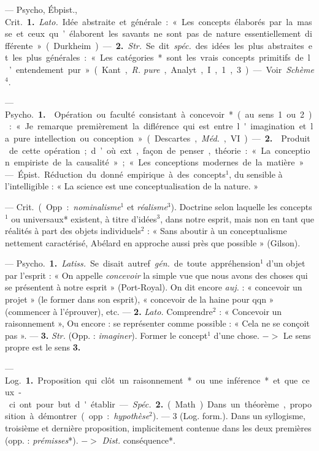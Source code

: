 \begin{itemize}[leftmargin=1cm, label=, itemsep=11pt]
 — \si{Psycho, Ébpist., Crit.} {\bf 1.}
 {\it Lato.} Idée abstraite et générale :
« Les concepts élaborés par la masse
et ceux qu’élaborent les savants ne
sont pas de nature essentiellement
différente » (Durkheim). — {\bf 2.}  {\it Str.}
Se dit  {\it spéc.} des idées les plus
abstraites et les plus générales :
« Les catégories* sont les vrais
concepts primitifs de l’entendement
pur» (Kant, {\it R. pure}, Analyt., I, 1, 3).
— Voir {\it Schème}$^4$.

 — \si{Psycho.} {\bf 1.}  Opération ou faculté consistant à concevoir* (au sens 1 ou 2) : « Je remarque
premièrement la diflérence qui est
entre l'imagination et la pure intellection ou conception » (Descartes,
{\it Méd.}, VI). — {\bf 2.}  Produit de cette
opération; d’où ext., façon de penser,
théorie : « La conception empiriste
de la causalité »; « Les conceptions
modernes de la matière ».

 — \si{Épist.} Réduction
du donné empirique à des concepts$^1$,
du sensible à l'intelligible : « La
science est une conceptualisation de
la nature. »

 — \si{Crit.} (Opp. : {\it nominalisme}$^1$ et {\it réalisme}$^3$).
 Doctrine
selon laquelle les concepts$^1$ ou universaux* existent, à titre d'idées$^3$,
dans notre esprit, mais non en tant
que réalités à part des objets individuels$^2$ : « Sans aboutir à un conceptualisme nettement caractérisé, Abélard en approche aussi près que possible » (Gilson).

 — \si{Psycho.} {\bf 1.} {\it Latiss.} Se
disait autref. {\it gén.} de toute appréhension$^1$ d’un objet par l'esprit : « On
appelle {\it concevoir} la simple vue que
nous avons des choses qui se présentent
à notre esprit » (Port-Royal).
On dit encore {\it auj.} : « concevoir un
projet » (le former dans son esprit),
« concevoir de la haine pour qqn »
(commencer à l’éprouver), etc. —
{\bf 2.}  {\it Lato.} Comprendre$^2$ : « Concevoir
un raisonnement », Ou encore : se
représenter comme possible : « Cela
ne se conçoit pas ». — {\bf 3.} {\it Str.} (Opp. :
{\it imaginer}). Former le concept$^1$ d’une
chose. $->$ Le sens propre est le
sens {\bf 3.}

 — \si{Log.} {\bf 1.} Proposition
qui clôt un raisonnement* ou une
inférence* et que ceux-ci ont pour
but d'établir. — {\it Spéc.} {\bf 2.} (Math)
Dans un théorème, proposition à
démontrer (opp. : {\it hypothèse}$^2$). —
3 (Log. form.). Dans un syllogisme, troisième et dernière proposition, implicitement contenue dans
les deux premières (opp. : {\it prémisses}*). $->$ {\it Dist.} conséquence*.


\end{itemize}
